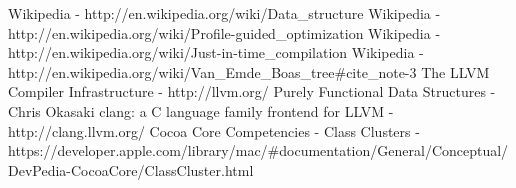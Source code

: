 \documentclass[a4paper,11pt]{article}
\begin{document}
\begin{thebibliography}{9}
	 Wikipedia - http://en.wikipedia.org/wiki/Data\_structure
     Wikipedia - http://en.wikipedia.org/wiki/Profile-guided\_optimization
     Wikipedia - http://en.wikipedia.org/wiki/Just-in-time\_compilation
     Wikipedia - http://en.wikipedia.org/wiki/Van\_Emde\_Boas\_tree\#cite\_note-3
	 The LLVM Compiler Infrastructure - http://llvm.org/
	 Purely Functional Data Structures - Chris Okasaki
	 clang: a C language family frontend for LLVM - http://clang.llvm.org/
	 Cocoa Core Competencies - Class Clusters - \\
		https://developer.apple.com/library/mac/\#documentation/General/Conceptual/DevPedia-CocoaCore/ClassCluster.html
\end{thebibliography}
\end{document}

